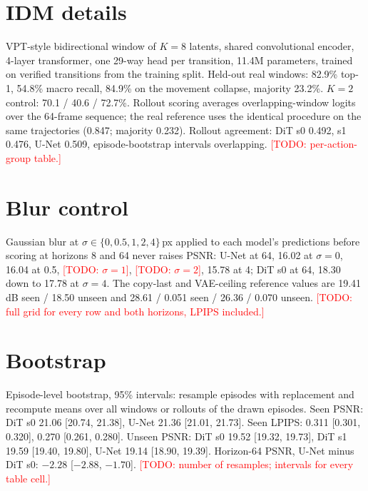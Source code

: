 \documentclass[10pt]{article}
\newcommand{\todo}[1]{\textcolor{red}{[TODO: #1]}}
\begin{document}
\section{IDM details}\label{app:idm}
VPT-style bidirectional window of $K{=}8$ latents, shared convolutional encoder, 4-layer transformer, one 29-way head per transition, 11.4M parameters, trained on verified transitions from the training split. Held-out real windows: 82.9\% top-1, 54.8\% macro recall, 84.9\% on the movement collapse, majority 23.2\%. $K{=}2$ control: 70.1 / 40.6 / 72.7\%. Rollout scoring averages overlapping-window logits over the 64-frame sequence; the real reference uses the identical procedure on the same trajectories (0.847; majority 0.232). Rollout agreement: DiT s0 0.492, s1 0.476, U-Net 0.509, episode-bootstrap intervals overlapping. \todo{per-action-group table.}

\section{Blur control}\label{app:blur}
Gaussian blur at $\sigma \in \{0, 0.5, 1, 2, 4\}$\,px applied to each model's predictions before scoring at horizons 8 and 64 never raises PSNR: U-Net at 64, 16.02 at $\sigma{=}0$, 16.04 at 0.5, \todo{$\sigma{=}1$}, \todo{$\sigma{=}2$}, 15.78 at 4; DiT s0 at 64, 18.30 down to 17.78 at $\sigma{=}4$. The copy-last and VAE-ceiling reference values are 19.41\,dB seen / 18.50 unseen and 28.61 / 0.051 seen / 26.36 / 0.070 unseen. \todo{full grid for every row and both horizons, LPIPS included.}

\section{Bootstrap}\label{app:boot}
Episode-level bootstrap, 95\% intervals: resample episodes with replacement and recompute means over all windows or rollouts of the drawn episodes. Seen PSNR: DiT s0 21.06 [20.74, 21.38], U-Net 21.36 [21.01, 21.73]. Seen LPIPS: 0.311 [0.301, 0.320], 0.270 [0.261, 0.280]. Unseen PSNR: DiT s0 19.52 [19.32, 19.73], DiT s1 19.59 [19.40, 19.80], U-Net 19.14 [18.90, 19.39]. Horizon-64 PSNR, U-Net minus DiT s0: $-2.28$ [$-2.88$, $-1.70$]. \todo{number of resamples; intervals for every table cell.}
\end{document}
